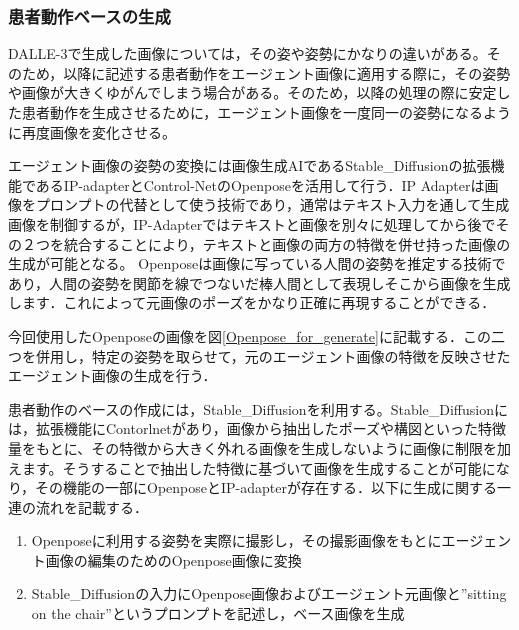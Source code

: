 \subsubsection{患者動作ベースの生成}\label{generate_correction_img}
DALLE-3で生成した画像については，その姿や姿勢にかなりの違いがある。そのため，以降に記述する患者動作をエージェント画像に適用する際に，その姿勢や画像が大きくゆがんでしまう場合がある。そのため，以降の処理の際に安定した患者動作を生成させるために，エージェント画像を一度同一の姿勢になるように再度画像を変化させる。 
\par
エージェント画像の姿勢の変換には画像生成AIであるStable_Diffusionの拡張機能であるIP-adapterとControl-NetのOpenposeを活用して行う．IP Adapterは画像をプロンプトの代替として使う技術であり，通常はテキスト入力を通して生成画像を制御するが，IP-Adapterではテキストと画像を別々に処理してから後でその２つを統合することにより，テキストと画像の両方の特徴を併せ持った画像の生成が可能となる。 Openposeは画像に写っている人間の姿勢を推定する技術であり，人間の姿勢を関節を線でつないだ棒人間として表現しそこから画像を生成します．これによって元画像のポーズをかなり正確に再現することができる．
\par
今回使用したOpenposeの画像を図\ref{Openpose_for_generate}に記載する．この二つを併用し，特定の姿勢を取らせて，元のエージェント画像の特徴を反映させたエージェント画像の生成を行う．

患者動作のベースの作成には，Stable_Diffusionを利用する。Stable_Diffusionには，拡張機能にContorlnetがあり，画像から抽出したポーズや構図といった特徴量をもとに、その特徴から大きく外れる画像を生成しないように画像に制限を加えます。そうすることで抽出した特徴に基づいて画像を生成することが可能になり，その機能の一部にOpenposeとIP-adapterが存在する．以下に生成に関する一連の流れを記載する．

\begin{enumerate}
   \item Openposeに利用する姿勢を実際に撮影し，その撮影画像をもとにエージェント画像の編集のためのOpenpose画像に変換
   \item Stable_Diffusionの入力にOpenpose画像およびエージェント元画像と”sitting on the chair”というプロンプトを記述し，ベース画像を生成
\end{enumerate}

